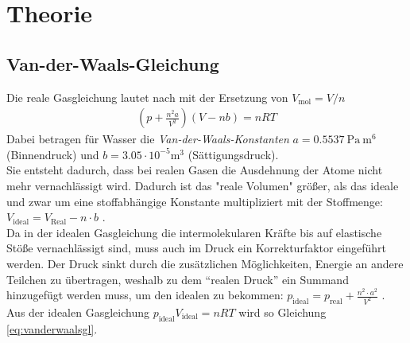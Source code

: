 \documentclass[12pt,a4paper,titlepage,headinclude,bibtotoc]{scrartcl}
\begin{document}
\section{Theorie}
\label{sec:theorie}

\subsection{Van-der-Waals-Gleichung}
Die reale Gasgleichung lautet nach \cite[S. 303]{gerthsen} mit der Ersetzung von $V_\text{mol}=V/n$ 
\begin{align}
\left(p+\frac{n^2a}{V^2}\right)\left( V-nb \right)=nRT \label{eq:vanderwaalsgl}
\end{align}
Dabei betragen für Wasser die \emph{Van-der-Waals-Konstanten} $a=0.5537~\si{\pascal~\meter^6}$ (Binnendruck) und $b=3.05\cdot10^{-5}\si{\meter^3}$ (Sättigungsdruck).\\
Sie entsteht dadurch, dass bei realen Gasen die Ausdehnung der Atome nicht mehr vernachlässigt wird.
Dadurch ist das "reale Volumen" größer, als das ideale und zwar um eine stoffabhängige Konstante multipliziert mit der Stoffmenge: $V_\text{ideal}=V_\text{Real}-n\cdot b$ .\\
Da in der idealen Gasgleichung die intermolekularen Kräfte bis auf elastische Stöße vernachlässigt sind, muss auch im Druck ein Korrekturfaktor eingeführt werden.
Der Druck sinkt durch die zusätzlichen Möglichkeiten, Energie an andere Teilchen zu übertragen, weshalb zu dem ``realen Druck'' ein Summand hinzugefügt werden muss, um den idealen zu bekommen: $p_\text{ideal}=p_\text{real}+\frac{n^2\cdot a^2}{V^2}$ .
Aus der idealen Gasgleichung $p_\text{ideal}V_\text{ideal}=nRT$ wird so Gleichung \eqref{eq:vanderwaalsgl}.
\end{document}
